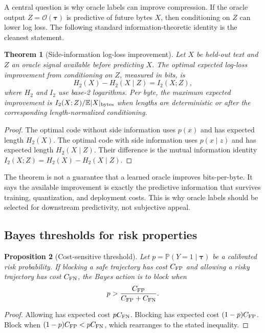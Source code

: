 \documentclass[11pt]{article}
\newtheorem{theorem}{Theorem}[section]
\newtheorem{proposition}[theorem]{Proposition}
\theoremstyle{definition}
\theoremstyle{remark}
\newcommand{\E}{\mathbb{E}}
\newcommand{\Prob}{\mathbb{P}}
\newcommand{\traj}{\boldsymbol{\tau}}
\numberwithin{equation}{section}
\begin{document}
A central question is why oracle labels can improve compression.  If the oracle output \(Z=\mathcal O(\traj)\) is predictive of future bytes \(X\), then conditioning on \(Z\) can lower log loss.  The following standard information-theoretic identity is the cleanest statement.

\begin{theorem}[Side-information log-loss improvement]
Let \(X\) be held-out text and \(Z\) an oracle signal available before predicting \(X\).  The optimal expected log-loss improvement from conditioning on \(Z\), measured in bits, is
\begin{equation}
    H_2(X)-H_2(X\mid Z)=I_2(X;Z),
\end{equation}
where \(H_2\) and \(I_2\) use base-2 logarithms.  Per byte, the maximum expected improvement is \(I_2(X;Z)/\E|X|_{\rm bytes}\) when lengths are deterministic or after the corresponding length-normalized conditioning.
\end{theorem}
\begin{proof}
The optimal code without side information uses \(p(x)\) and has expected length \(H_2(X)\).  The optimal code with side information uses \(p(x\mid z)\) and has expected length \(H_2(X\mid Z)\).  Their difference is the mutual information identity \(I_2(X;Z)=H_2(X)-H_2(X\mid Z)\).
\end{proof}

The theorem is not a guarantee that a learned oracle improves bits-per-byte.  It says the available improvement is exactly the predictive information that survives training, quantization, and deployment costs.  This is why oracle labels should be selected for downstream predictivity, not subjective appeal.

\subsection{Bayes thresholds for risk properties}

\begin{proposition}[Cost-sensitive threshold]
Let \(p=\Prob(Y=1\mid\traj)\) be a calibrated risk probability.  If blocking a safe trajectory has cost \(C_{\rm FP}\) and allowing a risky trajectory has cost \(C_{\rm FN}\), the Bayes action is to block when
\begin{equation}
    p>\frac{C_{\rm FP}}{C_{\rm FP}+C_{\rm FN}}.
\end{equation}
\end{proposition}
\begin{proof}
Allowing has expected cost \(pC_{\rm FN}\).  Blocking has expected cost \((1-p)C_{\rm FP}\).  Block when \((1-p)C_{\rm FP}<pC_{\rm FN}\), which rearranges to the stated inequality.
\end{proof}
\end{document}
